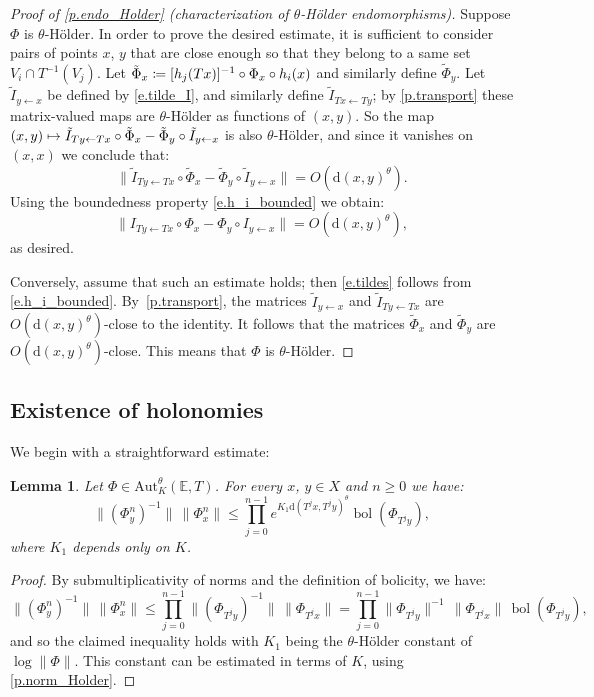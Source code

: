 \documentclass[JEP,XML,SOM,Unicode]{cedram}
\def\vcentcolon{\mathrel{\mathop\ordinarycolon}}
\providecommand\ordinarycolon{:}
\providecommand*\coloneqq{\vcentcolon\mathrel{\mkern-1.2mu}=}
\newcommand\mto{\mathchoice{\longmapsto}{\mapsto}{\mapsto}{\mapsto}}
\theoremstyle{plain}
\newtheorem{lemma}[theorem]{Lemma}
\theoremstyle{definition}
\newcommand{\EE}{\mathbb{E}}
\newcommand{\dd}{\mathrm{d}}
\newcommand{\Aut}{\mathrm{Aut}}
\DeclareMathOperator{\bol}{bol}
\begin{document}
\begin{proof}[Proof of \cref{p.endo_Holder} (characterization of $\theta$-Hölder endomorphisms)]
Suppose $\Phi$ is $\theta$-Hölder.
In order to prove the desired estimate, it is sufficient to consider pairs of points $x$, $y$ that are close enough so that they belong to a same set $V_i \cap T^{-1}(V_j)$. Let $\tilde \Phi_x \coloneqq [h_j(Tx)]^{-1} \circ \Phi_x \circ h_i(x)$ and similarly define $\tilde \Phi_y$.
Let $\tilde I_{y \gets x}$ be defined by \eqref{e.tilde_I}, and similarly define $\tilde I_{Tx \gets Ty}$;
by \cref{p.transport} these matrix-valued maps are $\theta$-Hölder as functions of $(x,y)$.
So the map $(x,y) \mto \tilde I_{Ty \gets Tx} \circ \tilde\Phi_x - \tilde \Phi_y \circ \tilde I_{y \gets x}$
is also $\theta$-Hölder, and since it vanishes on $(x,x)$ we conclude that:
\begin{equation}\label{e.tildes}
\big\| \tilde I_{Ty \gets Tx} \circ \tilde \Phi_x - \tilde \Phi_y \circ \tilde I_{y \gets x} \big\| = O(\dd(x,y)^\theta ).
\end{equation}
Using the boundedness property \eqref{e.h_i_bounded} we obtain:
\[
\big\| I_{Ty \gets Tx} \circ \Phi_x - \Phi_y \circ I_{y \gets x} \big\| = O(\dd(x,y)^\theta),
\]
as desired.

Conversely, assume that such an estimate holds; then \eqref{e.tildes} follows from \eqref{e.h_i_bounded}.
By~\cref{p.transport}, the matrices $\tilde I_{y \gets x}$ and $\tilde I_{Ty \gets Tx}$ are $O(\dd(x,y)^\theta)$-close to the identity.
It follows that the matrices $\tilde \Phi_x$ and $\tilde \Phi_y$ are $O(\dd(x,y)^\theta)$-close.
This means that $\Phi$ is $\theta$-Hölder.
\end{proof}

\subsection{Existence of holonomies}\label{ss.holonomies}

We begin with a straightforward estimate:

\begin{lemma}\label{l.bol}
Let $\Phi \in \Aut^\theta_K(\EE,T)$.
For every $x$, $y \in X$ and $n \ge 0$ we have:
\[
\| (\Phi^n_y)^{-1} \| \, \| \Phi^n_x \| \le \prod_{j=0}^{n-1} e^{K_1 \dd(T^j x, T^j y)^\theta} \bol(\Phi_{T^j y}),
\]
where $K_1$ depends only on $K$.
\end{lemma}

\begin{proof}
By submultiplicativity of norms and the definition of bolicity, we have:
\[
\| (\Phi^n_y)^{-1} \| \, \| \Phi^n_x \|
\le \prod_{j=0}^{n-1} \| (\Phi_{T^j y})^{-1} \| \, \| \Phi_{T^j x} \|
= \prod_{j=0}^{n-1} \| \Phi_{T^j y} \|^{-1} \, \| \Phi_{T^j x} \| \, \bol(\Phi_{T^j y}),
\]
and so the claimed inequality holds with $K_1$ being the $\theta$-Hölder constant of $\log \|\Phi\|$.
This constant can be estimated in terms of $K$, using \eqref{p.norm_Holder}.
\end{proof}
\end{document}
